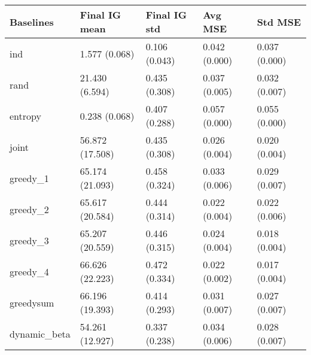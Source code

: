 \begin{tabular}{lllll}
\toprule
    Baselines &    Final IG mean &   Final IG std &        Avg MSE &        Std MSE \\
\midrule
          ind &    1.577 (0.068) &  0.106 (0.043) &  0.042 (0.000) &  0.037 (0.000) \\
         rand &   21.430 (6.594) &  0.435 (0.308) &  0.037 (0.005) &  0.032 (0.007) \\
      entropy &    0.238 (0.068) &  0.407 (0.288) &  0.057 (0.000) &  0.055 (0.000) \\
        joint &  56.872 (17.508) &  0.435 (0.308) &  0.026 (0.004) &  0.020 (0.004) \\
     greedy\_1 &  65.174 (21.093) &  0.458 (0.324) &  0.033 (0.006) &  0.029 (0.007) \\
     greedy\_2 &  65.617 (20.584) &  0.444 (0.314) &  0.022 (0.004) &  0.022 (0.006) \\
     greedy\_3 &  65.207 (20.559) &  0.446 (0.315) &  0.024 (0.004) &  0.018 (0.004) \\
     greedy\_4 &  66.626 (22.223) &  0.472 (0.334) &  0.022 (0.002) &  0.017 (0.004) \\
    greedysum &  66.196 (19.393) &  0.414 (0.293) &  0.031 (0.007) &  0.027 (0.007) \\
 dynamic\_beta &  54.261 (12.927) &  0.337 (0.238) &  0.034 (0.006) &  0.028 (0.007) \\
\bottomrule
\end{tabular}
